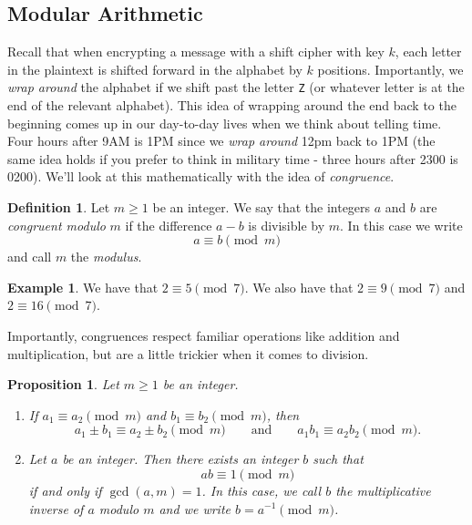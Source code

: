 \documentclass[12pt]{article}
\theoremstyle{plain}
\newtheorem{proposition}[theorem]{Proposition}
\theoremstyle{definition}
\newtheorem{definition}[theorem]{Definition}
\newtheorem{example}[theorem]{Example}
\theoremstyle{remark}
\begin{document}
\subsection{Modular Arithmetic}

Recall that when encrypting a message with a shift cipher with key $k$, each letter in the plaintext is shifted forward in the alphabet by $k$ positions.
Importantly, we \emph{wrap around} the alphabet if we shift past the letter \texttt{Z} (or whatever letter is at the end of the relevant alphabet).
This idea of wrapping around the end back to the beginning comes up in our day-to-day lives when we think about telling time.
Four hours after 9AM is 1PM since we \emph{wrap around} 12pm back to 1PM (the same idea holds if you prefer to think in military time - three hours after 2300 is 0200).
We'll look at this mathematically with the idea of \emph{congruence}.

\begin{definition}
    Let $m\geq 1$ be an integer. We say that the integers $a$ and $b$ are \emph{congruent modulo }$m$ if the difference $a-b$ is divisible by $m$.
    In this case we write
    \[
        a \equiv b \pmod{m}
    \]
    and call $m$ the \emph{modulus}.
\end{definition}


\begin{example}
    We have that $2 \equiv 5\pmod{7}$. We also have that $2\equiv 9\pmod 7$ and $2 \equiv 16\pmod 7$.
\end{example}

Importantly, congruences respect familiar operations like addition and multiplication, but are a little trickier when it comes to division.

\begin{proposition}\label{well defined}
    Let $m\geq 1$ be an integer.
    \begin{enumerate}
        \item If $a_1 \equiv a_2 \pmod m$ and $b_1 \equiv b_2\pmod m$, then
        \[
            a_1 \pm b_1 \equiv a_2 \pm b_2 \pmod m\qquad \text{and}\qquad a_1b_1\equiv a_2b_2\pmod m.
        \]

        \item Let $a$ be an integer. Then there exists an integer $b$ such that
        \[
            ab \equiv 1\pmod m
        \]
        if and only if $\gcd(a,m) = 1$.
        In this case, we call $b$ the \emph{multiplicative inverse of $a$ modulo $m$} and we write $b = a^{-1}\pmod m$.
    \end{enumerate}
\end{proposition}
\end{document}
